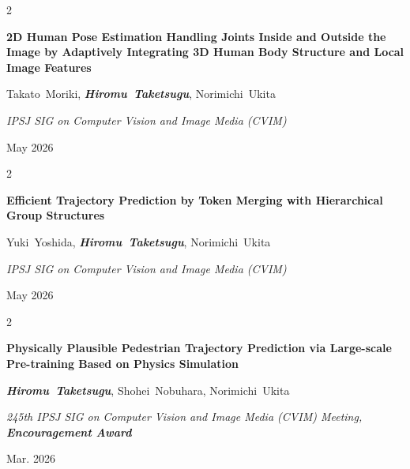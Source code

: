 \documentclass[10pt, letterpaper]{article}
\newenvironment{twocolentry}[2][]{
    \onecolentry
    \def\secondColumn{#2}
    \setcolumnwidth{\fill, 4.5 cm}
    \begin{paracol}{2}
}{
    \switchcolumn \raggedleft \secondColumn
    \end{paracol}
    \endonecolentry
} %
\begin{document}
        \begin{samepage}
            \begin{twocolentry}{
                May 2026
            }
                \textbf{2D Human Pose Estimation Handling Joints Inside and Outside the Image by Adaptively Integrating 3D Human Body Structure and Local Image Features}

                \vspace{0.10 cm}

                \mbox{Takato Moriki}, \mbox{\textbf{\textit{Hiromu Taketsugu}}}, \mbox{Norimichi Ukita}
                \vspace{0.10 cm}

                \textit{IPSJ SIG on Computer Vision and Image Media (CVIM)}
            \end{twocolentry}
        \end{samepage}

        \vspace{0.2 cm}

        \begin{samepage}
            \begin{twocolentry}{
                May 2026
            }
                \textbf{Efficient Trajectory Prediction by Token Merging with Hierarchical Group Structures}

                \vspace{0.10 cm}

                \mbox{Yuki Yoshida}, \mbox{\textbf{\textit{Hiromu Taketsugu}}}, \mbox{Norimichi Ukita}
                \vspace{0.10 cm}

                \textit{IPSJ SIG on Computer Vision and Image Media (CVIM)}
            \end{twocolentry}
        \end{samepage}

        \vspace{0.2 cm}

        \begin{samepage}
            \begin{twocolentry}{
                Mar. 2026
            }
                \textbf{Physically Plausible Pedestrian Trajectory Prediction via Large-scale Pre-training Based on Physics Simulation}

                \vspace{0.10 cm}

                \mbox{\textbf{\textit{Hiromu Taketsugu}}}, \mbox{Shohei Nobuhara}, \mbox{Norimichi Ukita}
                \vspace{0.10 cm}

                \textit{245th IPSJ SIG on Computer Vision and Image Media (CVIM) Meeting, \textbf{Encouragement Award}}
            \end{twocolentry}
        \end{samepage}
\end{document}
